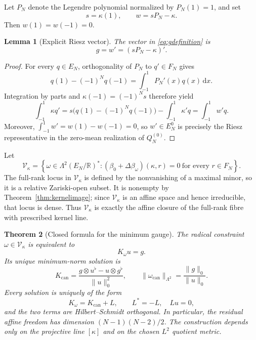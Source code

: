 \documentclass[11pt,a4paper]{article}
\newtheorem{theorem}{Theorem}[section]
\newtheorem{lemma}[theorem]{Lemma}
\theoremstyle{definition}
\theoremstyle{remark}
\newcommand{\R}{\mathbb{R}}
\newcommand{\dd}{\,\mathrm{d}}
\begin{document}
Let $P_N$ denote the Legendre polynomial normalized by $P_N(1)=1$, and set
\begin{equation}\label{eq:wdefinition}
 s=\kappa(1),\qquad w=sP_N-\kappa.
\end{equation}
Then $w(1)=w(-1)=0$.

\begin{lemma}[Explicit Riesz vector]\label{lem:explicitg}
The vector in \eqref{eq:gdefinition} is
\begin{equation}\label{eq:gexplicit}
 \boxed{g=w'=(sP_N-\kappa)'.}
\end{equation}
\end{lemma}

\begin{proof}
For every $q\in E_N$, orthogonality of $P_N$ to $q'\in F_N$ gives
\begin{equation}\label{eq:endpointlegendreidentity}
 q(1)-(-1)^Nq(-1)=\int_{-1}^{1}P_N'(x)q(x)\dd x.
\end{equation}
Integration by parts and
$\kappa(-1)=(-1)^Ns$ therefore yield
\[
 \int_{-1}^{1}\kappa q'
 =s\bigl(q(1)-(-1)^Nq(-1)\bigr)-\int_{-1}^{1}\kappa'q
 =\int_{-1}^{1}w'q.
\]
Moreover, $\int_{-1}^{1}w'=w(1)-w(-1)=0$, so $w'\in E_N^0$ is precisely the Riesz
representative in the zero-mean realization of $Q_N^{(0)}$.
\end{proof}

Let
\begin{equation}\label{eq:gaugefiberclosure}
 \mathcal V_\kappa=
 \left\{\omega\in\Lambda^2(E_N/\R)^*:
  (\beta_0+\Delta\beta_\omega)(\kappa,r)=0\ \text{for every }r\in F_N
 \right\}.
\end{equation}
The full-rank locus in $\mathcal V_\kappa$ is defined by the nonvanishing of a maximal minor,
so it is a relative Zariski-open subset.  It is nonempty by
Theorem~\ref{thm:kernelimage}; since $\mathcal V_\kappa$ is an affine space and hence
irreducible, that locus is dense.  Thus $\mathcal V_\kappa$ is exactly the affine closure of
the full-rank fibre with prescribed kernel line.

\begin{theorem}[Closed formula for the minimum gauge]\label{thm:minimumgauge}
The radical constraint $\omega\in\mathcal V_\kappa$ is equivalent to
\begin{equation}\label{eq:KuEqualsg}
 K_\omega u=g.
\end{equation}
Its unique minimum-norm solution is
\begin{equation}\label{eq:Kcanonical}
 \boxed{
 K_{\mathrm{can}}
 =\frac{g\otimes u^\flat-u\otimes g^\flat}{\|u\|_0^2},
 \qquad
 \|\omega_{\mathrm{can}}\|_{\Lambda^2}
 =\frac{\|g\|_0}{\|u\|_0}.}
\end{equation}
Every solution is uniquely of the form
\begin{equation}\label{eq:allfibreoperators}
 K_\omega=K_{\mathrm{can}}+L,
 \qquad L^*=-L,\quad Lu=0,
\end{equation}
and the two terms are Hilbert--Schmidt orthogonal.  In particular, the residual affine
freedom has dimension $(N-1)(N-2)/2$.  The construction depends only on the projective line
$[\kappa]$ and on the chosen $L^2$ quotient metric.
\end{theorem}
\end{document}
